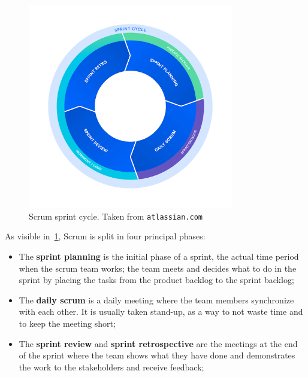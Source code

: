 \begin{figure}[ht]
  \centering
  \includegraphics[width=0.8\textwidth]{chapters/02/assets/scrum}
  \caption{Scrum sprint cycle. Taken from \texttt{atlassian.com}}
  \label{fig:scrum-sprint-cycle}
\end{figure}

As visible in~\cref{fig:scrum-sprint-cycle}, Scrum is split in four principal phases:
\begin{itemize}
  \item The \textbf{sprint planning} is the initial phase of a sprint, the actual time period when the scrum team works; the team meets and decides what to do in the sprint by placing the tasks from the product backlog to the sprint backlog;
  \item The \textbf{daily scrum} is a daily meeting where the team members synchronize with each other. It is usually taken stand-up, as a way to not waste time and to keep the meeting short;
  \item The \textbf{sprint review} and \textbf{sprint retrospective} are the meetings at the end of the sprint where the team shows what they have done and demonstrates the work to the stakeholders and receive feedback;
\end{itemize}
